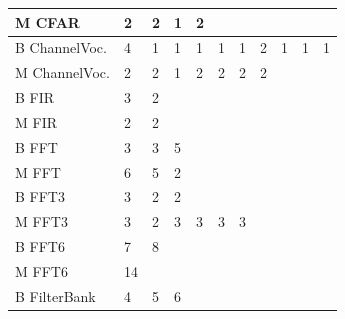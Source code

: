 \begin{table}[!htb]
\begin{tabular} { | l | l | l | l | l | l | l | l | l | l |l| }
    M CFAR & 2 & 2  & 1  & 2 & \cellcolor[gray]{0.3}& \cellcolor[gray]{0.3}& \cellcolor[gray]{0.3}& \cellcolor[gray]{0.3}& \cellcolor[gray]{0.3}& \cellcolor[gray]{0.3} \\ \hline\hline
    B ChannelVoc.& 4 & 1 & 1 & 1 & 1 & 1 & 2 & 1 & 1 & 1 \\ \hline 
    M ChannelVoc.& 2 & 2 & 1 & 2 & 2& 2 & 2& \cellcolor[gray]{0.3}& \cellcolor[gray]{0.3}& \cellcolor[gray]{0.3} \\ \hline\hline
    B FIR & 3 & 2 &\cellcolor[gray]{0.3}&\cellcolor[gray]{0.3}&\cellcolor[gray]{0.3}&\cellcolor[gray]{0.3}&\cellcolor[gray]{0.3}&\cellcolor[gray]{0.3}&\cellcolor[gray]{0.3}&\cellcolor[gray]{0.3}\\ \hline
    M FIR & 2 & 2&\cellcolor[gray]{0.3}&\cellcolor[gray]{0.3}&\cellcolor[gray]{0.3}&\cellcolor[gray]{0.3}&\cellcolor[gray]{0.3}&\cellcolor[gray]{0.3}&\cellcolor[gray]{0.3}&\cellcolor[gray]{0.3}\\ \hline\hline
    B FFT & 3 & 3 & 5 & \cellcolor[gray]{0.3}& \cellcolor[gray]{0.3}& \cellcolor[gray]{0.3}& \cellcolor[gray]{0.3}& \cellcolor[gray]{0.3}& \cellcolor[gray]{0.3}& \cellcolor[gray]{0.3} \\ \hline
    M FFT & 6& 5 & 2& \cellcolor[gray]{0.3}& \cellcolor[gray]{0.3}& \cellcolor[gray]{0.3}& \cellcolor[gray]{0.3}& \cellcolor[gray]{0.3}& \cellcolor[gray]{0.3}& \cellcolor[gray]{0.3} \\ \hline\hline
    B FFT3 & 3 & 2 & 2& \cellcolor[gray]{0.3}& \cellcolor[gray]{0.3}& \cellcolor[gray]{0.3}& \cellcolor[gray]{0.3}& \cellcolor[gray]{0.3}& \cellcolor[gray]{0.3}& \cellcolor[gray]{0.3} \\ \hline 
    M FFT3 & 3 & 2 & 3 & 3& 3& 3& \cellcolor[gray]{0.3}& \cellcolor[gray]{0.3}& \cellcolor[gray]{0.3}& \cellcolor[gray]{0.3} \\ \hline\hline
    B FFT6 & 7 & 8& \cellcolor[gray]{0.3}& \cellcolor[gray]{0.3}& \cellcolor[gray]{0.3}& \cellcolor[gray]{0.3}& \cellcolor[gray]{0.3}& \cellcolor[gray]{0.3}& \cellcolor[gray]{0.3}& \cellcolor[gray]{0.3}\\ \hline
    M FFT6& 14 & \cellcolor[gray]{0.3}& \cellcolor[gray]{0.3}& \cellcolor[gray]{0.3}& \cellcolor[gray]{0.3}& \cellcolor[gray]{0.3}& \cellcolor[gray]{0.3}& \cellcolor[gray]{0.3}& \cellcolor[gray]{0.3}& \cellcolor[gray]{0.3} \\ \hline\hline
    B FilterBank & 4 & 5 & 6& \cellcolor[gray]{0.3}& \cellcolor[gray]{0.3}& \cellcolor[gray]{0.3}& \cellcolor[gray]{0.3}& \cellcolor[gray]{0.3}& \cellcolor[gray]{0.3}& \cellcolor[gray]{0.3} \\ \hline

\end{tabular}
\end{table}
